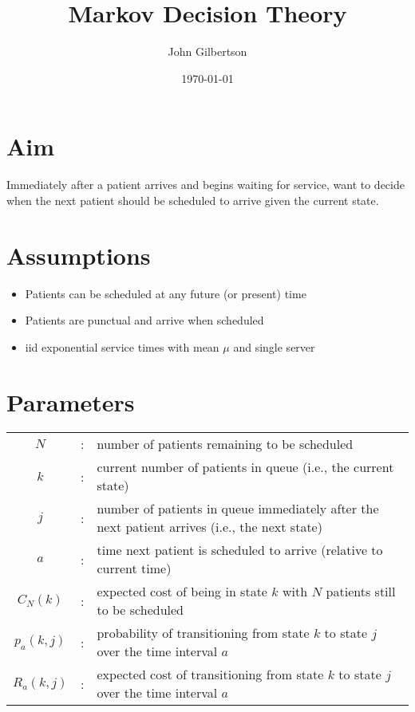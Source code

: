 \documentclass{article}
\title{Markov Decision Theory}
\author{John Gilbertson}
\date{\today}
\begin{document}
\maketitle

\tableofcontents

\newpage

\section{Aim}

Immediately after a patient arrives and begins waiting for service, want to decide when the next patient should be scheduled to arrive given the current state.

\section{Assumptions}

\begin{itemize}
	\item Patients can be scheduled at any future (or present) time
	\item Patients are punctual and arrive when scheduled
	\item iid exponential service times with mean $\mu$ and single server
\end{itemize}

\section{Parameters}

\begin{tabularx}{\textwidth}{c c X}
	$N$ & : & number of patients remaining to be scheduled \\
	$k$ & : & current number of patients in queue (i.e., the current state) \\
	$j$ & : & number of patients in queue immediately after the next patient arrives (i.e., the next state) \\
	$a$ & : & time next patient is scheduled to arrive (relative to current time) \\
	$C_{N} (k)$ & : & expected cost of being in state $k$ with $N$ patients still to be scheduled \\
	$p_{a} (k, j)$ & : & probability of transitioning from state $k$ to state $j$ over the time interval $a$ \\
	$R_{a} (k, j)$ & : & expected cost of transitioning from state $k$ to state $j$ over the time interval $a$ \\
\end{tabularx}
\end{document}
